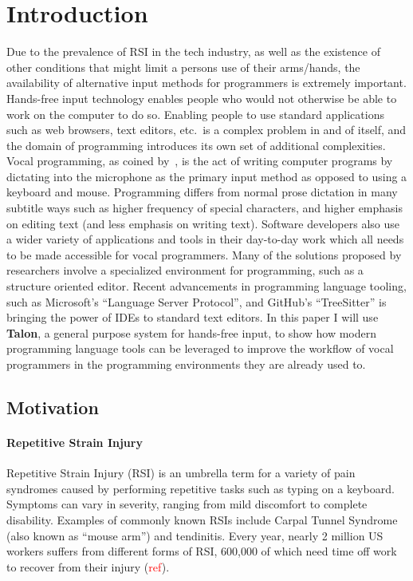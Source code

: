 \documentclass[../thesis.tex]{subfiles}
\begin{document}
\chapter{Introduction}
Due to the prevalence of RSI in the tech industry, as well as the existence of other conditions that might limit a persons use of their arms/hands, the availability
of alternative input methods for programmers is extremely important.
Hands-free input technology enables people who would not otherwise be able to work on the computer to do so.
Enabling people to use standard applications such as web browsers, text editors, etc.\ is a complex problem in and of itself, and the domain of programming
introduces its own set of additional complexities.
Vocal programming, as coined by~\parencite{Arnold}, is the act of writing computer programs by dictating into the microphone as the primary input method as opposed to using a keyboard and mouse.
Programming differs from normal prose dictation in many subtitle ways such as higher frequency of special characters, and higher emphasis on editing text (and less emphasis on writing text).
Software developers also use a wider variety of applications and tools in their day-to-day work which all needs to be made accessible for vocal programmers.
Many of the solutions proposed by researchers involve a specialized environment for programming, such as a structure oriented editor.
Recent advancements in programming language tooling, such as Microsoft's ``Language Server Protocol'', and GitHub's ``TreeSitter'' is bringing the power of IDEs to standard text editors.
In this paper I will use \textbf{Talon}, a general purpose system for hands-free input, to show how modern programming language
   tools can be leveraged to improve the workflow of vocal programmers in the programming environments they are already used to.

\section{Motivation}

\subsubsection{Repetitive Strain Injury}
Repetitive Strain Injury (RSI) is an umbrella term for a variety of pain syndromes caused by
performing repetitive tasks such as typing on a keyboard.
Symptoms can vary in severity, ranging from mild discomfort to complete disability.
Examples of commonly known RSIs include Carpal Tunnel Syndrome (also known as ``mouse arm'') and tendinitis.
Every year, nearly 2 million US workers suffers from different forms of RSI, 600,000 of which
need time off work to recover from their injury (\textcolor{red}{ref}).
\end{document}
